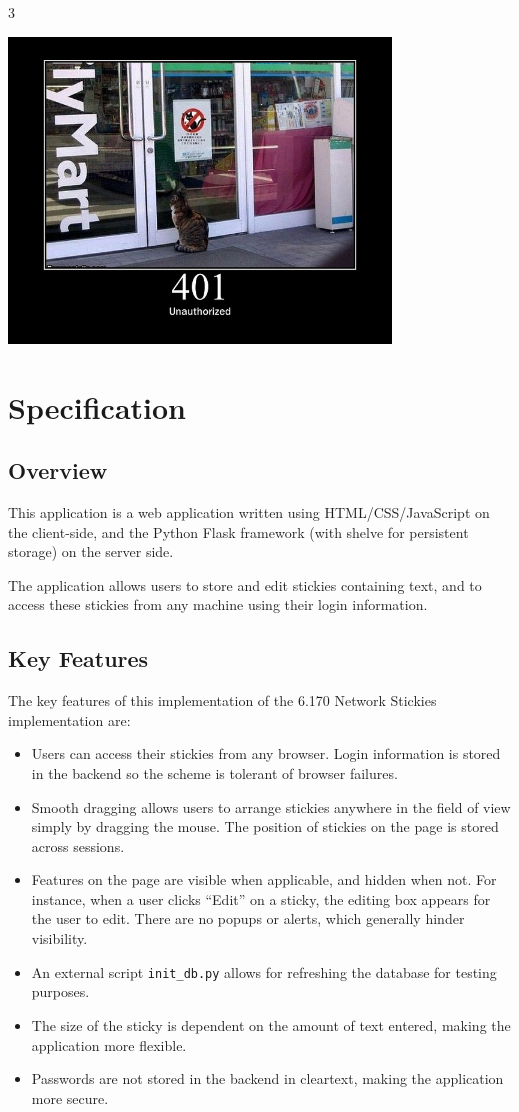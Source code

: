 3\documentclass[11pt,letterpaper]{article}
\begin{document}
\begin{center}
\includegraphics[width=4in]{dot/401.jpg}
\label{fig:401} 
\end{center}

\section{Specification}
\subsection{Overview}
This application is a web application written using HTML/CSS/JavaScript on the client-side, and the Python Flask framework (with shelve for persistent storage) on the server side.

The application allows users to store and edit stickies containing text, and to access these stickies from any machine using their login information.

\subsection{Key Features}
The key features of this implementation of the 6.170 Network Stickies implementation are:
\begin{itemize}
\item Users can access their stickies from any browser. Login information is stored in the backend so the scheme is tolerant of browser failures.
\item Smooth dragging allows users to arrange stickies anywhere in the field of view simply by dragging the mouse. The position of stickies on the page is stored across sessions.
\item Features on the page are visible when applicable, and hidden when not. For instance, when a user clicks ``Edit'' on a sticky, the editing box appears for the user to edit. There are no popups or alerts, which generally hinder visibility.
\item An external script \texttt{init\_db.py} allows for refreshing the database for testing purposes.
\item The size of the sticky is dependent on the amount of text entered, making the application more flexible.
\item Passwords are not stored in the backend in cleartext, making the application more secure.
\end{itemize}
\end{document}
